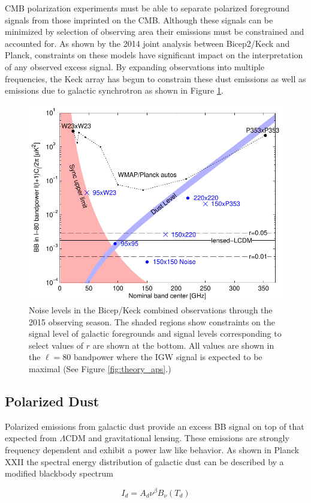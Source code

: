 \documentclass[12pt]{article}
\begin{document}
CMB polarization experiments must be able to separate polarized foreground
signals from those imprinted on the CMB. Although these signals can be
minimized by selection of observing area their emissions must be constrained
and accounted for. As shown by the 2014 joint analysis between Bicep2/Keck and
Planck, constraints on these models have significant impact on the
interpretation of any observed excess signal. By expanding observations into
multiple frequencies, the Keck array has begun to constrain these dust
emissions as well as emissions due to galactic synchrotron as shown in Figure
\ref{fig:noilev}.
\begin{figure}
	\center
	\includegraphics[width=.7\textwidth]{noilev_bk15.pdf}
	\caption{Noise levels in the Bicep/Keck combined observations through the
	2015 observing season. The shaded regions show constraints on the signal
	level of galactic foregrounds and signal levels corresponding to select values
	of $r$ are shown at the bottom. All values are shown in the $\ell=80$
	bandpower where the IGW signal is expected to be maximal (See Figure
	\ref{fig:theory_aps}.)}
	\label{fig:noilev}
\end{figure}

\subsection{Polarized Dust}
Polarized emissions from galactic dust provide an excess BB signal on top of
that expected from $\Lambda$CDM and gravitational lensing. These emissions 
are strongly frequency dependent and exhibit a power law like behavior. As shown
in Planck XXII \cite{cite:PlanckXXII} the spectral energy distribution of
galactic dust can be described by a modified blackbody spectrum

\begin{equation}
	I_d=A_d\nu ^\beta B_{\nu}(T_d)
	\label{eq:dust_sed}
\end{equation}
\end{document}
